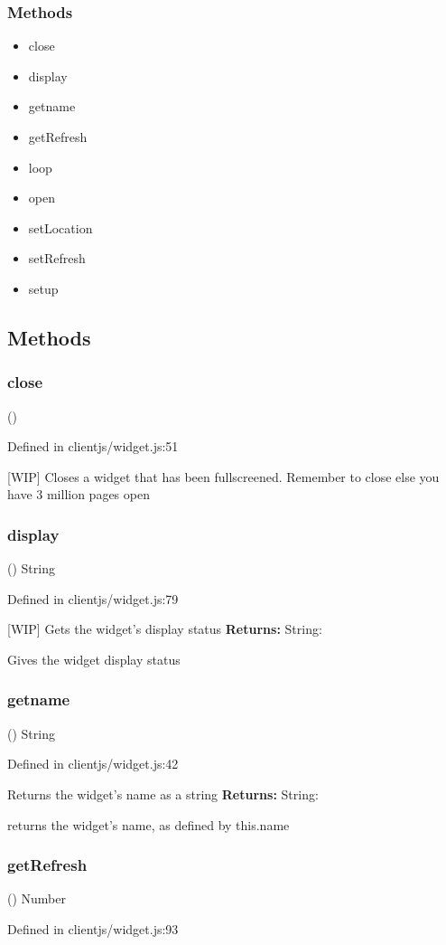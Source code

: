 \documentclass[10pt]{article}
\begin{document}
\subsubsection*{Methods}
\begin{itemize}
\item close
\item display
\item getname
\item getRefresh
\item loop
\item open
\item setLocation
\item setRefresh
\item setup

\end{itemize}
\subsection*{Methods}
\subsubsection*{close}
()

  Defined in clientjs/widget.js:51


 [WIP] Closes a widget that has been fullscreened. Remember to close else you have 3 million pages open
\subsubsection*{display}
()  String 

  Defined in clientjs/widget.js:79


 [WIP] Gets the widget's display status
\textbf{Returns:}
String: 

 Gives the widget display status
\subsubsection*{getname}
()  String 

  Defined in clientjs/widget.js:42


 Returns the widget's name as a string
\textbf{Returns:}
String: 

 returns the widget's name, as defined by this.name
\subsubsection*{getRefresh}
()  Number 

  Defined in clientjs/widget.js:93
\end{document}

